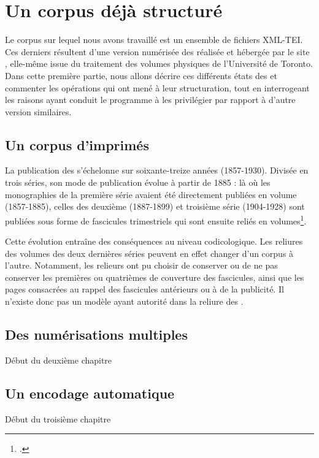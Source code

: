 \part{Un corpus déjà structuré}

\clearpage
\thispagestyle{empty}
\cleardoublepage
{}
Le corpus sur lequel nous avons travaillé est un ensemble de fichiers XML-TEI. Ces derniers résultent d'une version numérisée des \odm{} réalisée et hébergée par le site \ia, elle-même issue du traitement des volumes physiques de l'Université de Toronto. Dans cette première partie, nous allons décrire ces différents états des \odm{} et commenter les opérations qui ont mené à leur structuration, tout en interrogeant les raisons ayant conduit le programme \timeus{} à les privilégier par rapport à d'autre version similaires.

\chapter{Un corpus d'imprimés}

La publication des \odm{} s'échelonne sur soixante-treize années (1857-1930). Divisée en trois séries, son mode de publication évolue à partir de 1885  : là  où les monographies de la première série avaient été directement publiées en volume (1857-1885), celles des deuxième (1887-1899) et troisième série (1904-1928) sont publiées sous forme de fascicules trimestriels qui sont ensuite reliés en volumes\footnote{\cite[p. 124]{lorry}.}.

Cette évolution entraîne des conséquences au niveau codicologique. Les reliures des volumes des deux dernières séries peuvent en effet changer d'un corpus à l'autre. Notamment, les relieurs ont pu choisir de conserver ou de ne pas conserver les premières ou  quatrièmes de couverture des fascicules, ainsi que les pages consacrées au rappel des fascicules antérieurs ou à de la publicité. Il n'existe donc pas un modèle ayant autorité dans la reliure des \odm{}.

\chapter{Des numérisations multiples}

Début du deuxième chapitre

\chapter{Un encodage automatique}

Début du troisième chapitre